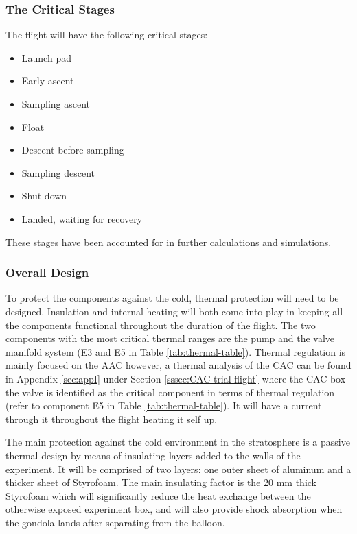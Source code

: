 \subsubsection{The Critical Stages}
The flight will have the following critical stages:
\begin{itemize}
    \item Launch pad
    \item Early ascent
    \item Sampling ascent
    \item Float
    \item Descent before sampling
    \item Sampling descent
    \item Shut down
    \item Landed, waiting for recovery
\end{itemize}
These stages have been accounted for in further calculations and simulations.

\subsubsection{Overall Design}
To protect the components against the cold, thermal protection will need to be designed. Insulation and internal heating will both come into play in keeping all the components functional throughout the duration of the flight. The two components with the most critical thermal ranges are the pump and the valve manifold system (E3 and E5 in Table \ref{tab:thermal-table}). Thermal regulation is mainly focused on the AAC however, a thermal analysis of the CAC can be found in Appendix \ref{sec:appI} under Section \ref{sssec:CAC-trial-flight} where the  CAC box the valve is identified as the critical component in terms of thermal regulation (refer to component E5 in Table \ref{tab:thermal-table}). It will have a current through it throughout the flight heating it self up.

The main protection against the cold environment in the stratosphere is a passive thermal design by means of  insulating layers added to the walls of the experiment. It will be comprised of two layers: one outer sheet of aluminum and a thicker sheet of Styrofoam. The main insulating factor is the 20 mm thick Styrofoam which will significantly reduce the heat exchange between the otherwise exposed experiment box, and will also provide shock absorption when the gondola lands after separating from the balloon.

